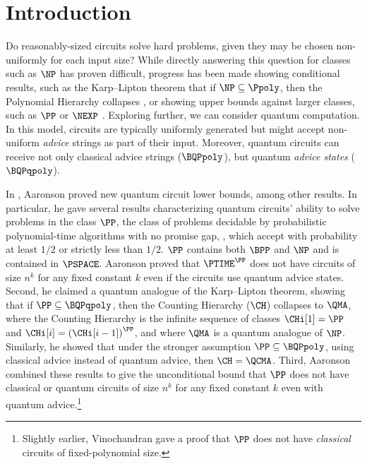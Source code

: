 
%
%
%

%
%

%
\section{Introduction}

Do reasonably-sized circuits solve hard problems, 
given they may be chosen non-uniformly for each input size?
While directly answering this question for classes such as $\NP$ has proven difficult,
progress has been made showing conditional results,
such as the Karp--Lipton theorem that if $\NP\subseteq \Ppoly$,
then the Polynomial Hierarchy collapses \cite{karp1980some},
or showing upper bounds against larger classes,
such as $\PP$ or $\NEXP$ \cite{vinodchandran2005note,williams2014nonuniform}.
Exploring further, we can consider quantum computation.
In this model, circuits are typically uniformly generated
but might accept non-uniform \emph{advice} strings as part of their input.
Moreover, quantum circuits can receive not only classical
advice strings ($\BQPpoly$), but quantum \emph{advice states} ($\BQPqpoly$).

In \cite{aaronson_subtle}, Aaronson proved new quantum circuit lower bounds,
among other results.
In particular, he gave several results characterizing quantum circuits' ability
to solve problems in the class $\PP$,
the class of problems decidable by probabilistic 
%
polynomial-time %
algorithms with no promise gap,
\ie{}, which accept with probability at least $1/2$ or strictly less than $1/2$.
$\PP$ contains both $\BPP$ and $\NP$ and is contained in $\PSPACE$.
Aaronson proved that $\PTIME^\PP$ does not have circuits of size $n^k$ for any
fixed constant $k$ even if the circuits use quantum advice states.
Second, he claimed a quantum analogue of the Karp--Lipton theorem, showing that if
$\PP\subseteq \BQPqpoly$, then the Counting Hierarchy ($\CH$) collapses to $\QMA$,
where the Counting Hierarchy is the infinite sequence of classes $\CHi[1]=\PP$ and
$\CHi[i]=\left(\CHi[i-1]\right)^\PP$,
and where $\QMA$ is a quantum analogue of $\NP$.
Similarly, he showed that under the stronger assumption $\PP \subseteq \BQPpoly$,
using classical advice instead of quantum advice,
then $\CH = \QCMA$.
Third, Aaronson combined these results to give the unconditional bound that $\PP$
does not have classical or quantum circuits of size $n^k$ for
any fixed constant $k$ even with quantum advice.\footnote{Slightly earlier,
	Vinochandran \cite{vinodchandran2005note} gave a proof that $\PP$ does not
	have \emph{classical} circuits of %
	fixed-polynomial size.} %

